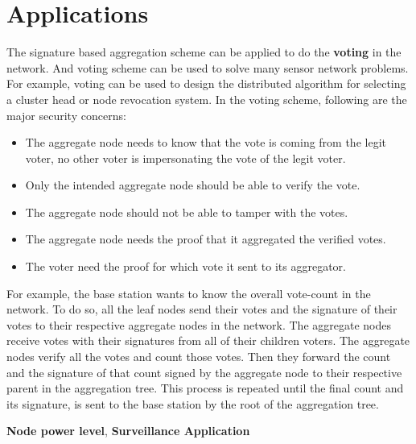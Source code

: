 \section{Applications}
		The signature based aggregation scheme can be applied to do the \textbf{voting} in the network.
		And voting scheme can be used to solve many sensor network problems.
		For example, voting can be used to design the distributed algorithm for selecting a cluster head or node revocation system.
		In the voting scheme, following are the major security concerns: 
		\begin{itemize}
			\item The aggregate node needs to know that the vote is coming from the legit voter, no other voter is impersonating the vote of the legit voter.
			\item Only the intended aggregate node should be able to verify the vote.
			\item The aggregate node should not be able to tamper with the votes. 
			\item The aggregate node needs the proof that it aggregated the verified votes.
			\item The voter need the proof for which vote it sent to its aggregator.
		\end{itemize}
		For example, the base station wants to know the overall vote-count in the network.
		To do so, all the leaf nodes send their votes and the signature of their votes to their respective aggregate nodes in the network.
		The aggregate nodes receive votes with their signatures from all of their children voters.
		The aggregate nodes verify all the votes and count those votes.
		Then they forward the count and the signature of that count signed by the aggregate node to their respective parent in the aggregation tree.
		This process is repeated until the final count and its signature, is sent to the base station by the root of the aggregation tree.
				
\textbf{Node power level},
\textbf{Surveillance Application}
